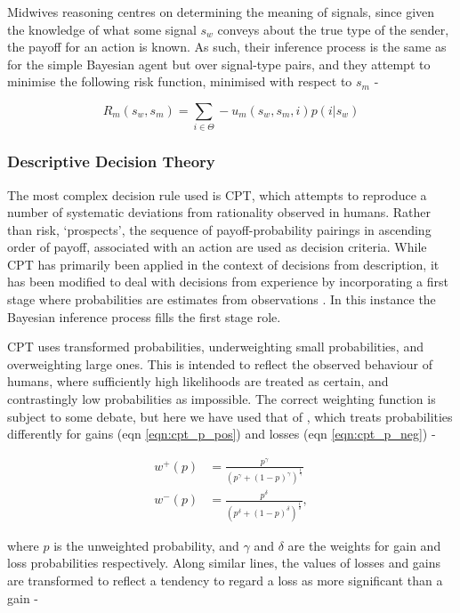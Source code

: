 Midwives reasoning centres on determining the meaning of signals, since given the knowledge of what some signal \(s_{w}\) conveys about the true type of the sender, the payoff for an action is known. As such, their inference process is the same as for the simple Bayesian agent but over signal-type pairs, and they attempt to minimise the following risk function, minimised with respect to \(s_{m}\) -

\begin{equation}
R_{m}(s_{w}, s_{m}) = \sum_{i\in \Theta} -u_{m}(s_{w}, s_{m}, i)p(i | s_{w})
\end{equation}

\subsubsection{Descriptive Decision Theory}

The most complex decision rule used is \ac{CPT}, which attempts to reproduce a number of systematic deviations from rationality observed in humans. Rather than risk, `prospects', the sequence of payoff-probability pairings in ascending order of payoff, associated with an action  are used as decision criteria. While \ac{CPT} has primarily been applied in the context of decisions from description, it has been modified to deal with decisions from experience by incorporating a first stage where probabilities are estimates from observations \cite{FoxCPT}. In this instance the Bayesian inference process fills the first stage role.

\ac{CPT} uses transformed probabilities, underweighting small probabilities, and overweighting large ones. This is intended to reflect the observed behaviour of humans, where sufficiently high likelihoods are treated as certain, and contrastingly low probabilities as impossible. The correct weighting function is subject to some debate, but here we have used that of \citet{Tversky1992}, which treats probabilities differently for gains (eqn \ref{eqn:cpt_p_pos}) and losses (eqn \ref{eqn:cpt_p_neg}) -

\begin{align}
w^{+}(p) & = \frac{p^{\gamma}}{(p^{\gamma}+(1-p)^{\gamma})^{\frac{1}{\gamma}}}\label{eqn:cpt_p_pos}\\
w^{-}(p) & = \frac{p^{\delta}}{(p^{\delta}+(1-p)^{\delta})^{\frac{1}{\delta}}}\label{eqn:cpt_p_neg},
\end{align}


where $p$ is the unweighted probability, and $\gamma$ and $\delta$
are the weights for gain and loss probabilities respectively. Along similar lines, the values of losses and gains are transformed to reflect a tendency to regard a loss as more significant than a gain  -

